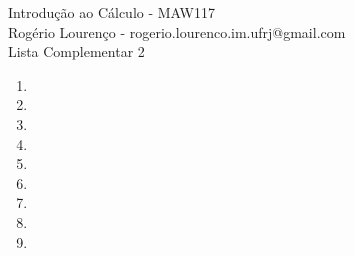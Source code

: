 \documentclass{article}
\begin{document}
\begin{flushleft}
	Introdução ao Cálculo - MAW117\\
	Rogério Lourenço - rogerio.lourenco.im.ufrj@gmail.com\\
	Lista Complementar 2
\end{flushleft}

\begin{enumerate}
	\item 
	\item 
	\item 
	\item 
	\item 
	\item 
	\item 
	\item 
	\item 
\end{enumerate}
\end{document}
